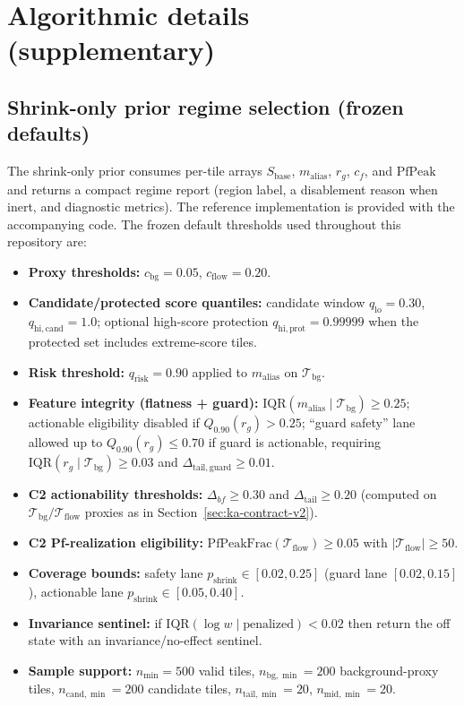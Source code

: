 \documentclass[11pt]{article}
\newif\ifSUPPLEMENTONLY
\begin{document}
\section{Algorithmic details (supplementary)}
\label{app:alg-details}

\subsection{Shrink-only prior regime selection (frozen defaults)}
The shrink-only prior consumes per-tile arrays
$S_{\mathrm{base}}$, $m_{\mathrm{alias}}$, $r_g$, $c_f$, and $\mathrm{PfPeak}$ and returns a compact regime report (region label, a disablement reason when inert, and diagnostic metrics). The reference implementation is provided with the accompanying code. The frozen default thresholds used throughout this repository are:
  \begin{itemize}[nosep]
	  \item \textbf{Proxy thresholds:} $c_{\mathrm{bg}}=0.05$, $c_{\mathrm{flow}}=0.20$.
	  \item \textbf{Candidate/protected score quantiles:} candidate window $q_{\mathrm{lo}}=0.30$, $q_{\mathrm{hi,cand}}=1.0$; optional high-score protection $q_{\mathrm{hi,prot}}=0.99999$ when the protected set includes extreme-score tiles.
	  \item \textbf{Risk threshold:} $q_{\mathrm{risk}}=0.90$ applied to $m_{\mathrm{alias}}$ on $\mathcal{T}_{\mathrm{bg}}$.
  \item \textbf{Feature integrity (flatness + guard):} $\mathrm{IQR}(m_{\mathrm{alias}}\mid\mathcal{T}_{\mathrm{bg}})\ge 0.25$; actionable eligibility disabled if $Q_{0.90}(r_g)>0.25$; ``guard safety'' lane allowed up to $Q_{0.90}(r_g)\le 0.70$ if guard is actionable, requiring $\mathrm{IQR}(r_g\mid\mathcal{T}_{\mathrm{bg}})\ge 0.03$ and $\Delta_{\mathrm{tail,guard}}\ge 0.01$.
  \item \textbf{C2 actionability thresholds:} $\Delta_{bf}\ge 0.30$ and $\Delta_{\mathrm{tail}}\ge 0.20$ (computed on $\mathcal{T}_{\mathrm{bg}}/\mathcal{T}_{\mathrm{flow}}$ proxies as in \ifSUPPLEMENTONLY the main paper\else Section~\ref{sec:ka-contract-v2}\fi).
  \item \textbf{C2 Pf-realization eligibility:} $\mathrm{PfPeakFrac}(\mathcal{T}_{\mathrm{flow}})\ge 0.05$ with $|\mathcal{T}_{\mathrm{flow}}|\ge 50$.
  \item \textbf{Coverage bounds:} safety lane $p_{\mathrm{shrink}}\in[0.02,0.25]$ (guard lane $[0.02,0.15]$), actionable lane $p_{\mathrm{shrink}}\in[0.05,0.40]$.
	  \item \textbf{Invariance sentinel:} if $\mathrm{IQR}(\log w\mid \text{penalized}) < 0.02$ then return the off state with an invariance/no-effect sentinel.
	  \item \textbf{Sample support:} $n_{\min}=500$ valid tiles, $n_{\mathrm{bg},\min}=200$ background-proxy tiles, $n_{\mathrm{cand},\min}=200$ candidate tiles, $n_{\mathrm{tail},\min}=20$, $n_{\mathrm{mid},\min}=20$.
  \end{itemize}
\end{document}
